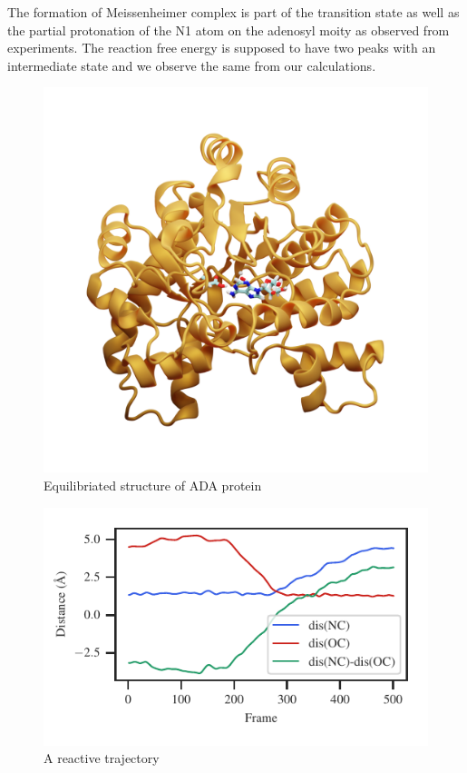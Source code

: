 \documentclass[journal=jpcbfk,manuscript=article,layout=twocolumn]{achemso}
\begin{document}
The formation of Meissenheimer complex is part of the 
transition state as well as the partial protonation of the 
N1 atom on the adenosyl moity as observed from experiments. 
The reaction free energy is supposed to have two peaks with 
an intermediate state and we observe the same from our calculations. 
\begin{figure}[ht!]
\centering
\includegraphics[scale=0.2]{./figures/ada-equil.png}
\caption{Equilibriated structure of ADA protein}
\label{fig:ada-equil}
\end{figure}

\begin{figure}
\includegraphics[scale=1.0]{figures/ada-diff60.pdf}
\caption{A reactive trajectory}
\label{fig:ada-reactive-traj}
\end{figure}
\end{document}
